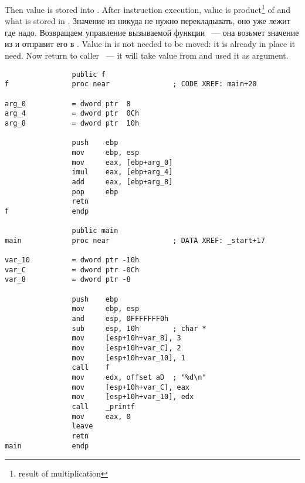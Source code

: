 {Then  value is stored into \EAX. After \IMUL instruction execution, \EAX value is 
product\footnote{result of multiplication} of \EAX and what is stored in .}
\IFRU
{Значение из \EAX никуда не нужно перекладывать, оно уже лежит где надо. Возвращаем управление вызываемой 
функции ~--- она возьмет значение из \EAX и отправит его в \printf.}
{Value in \EAX is not needed to be moved: it is already in place it need. Now return to caller ~--- it 
will take value from \EAX and used it as \printf argument.}

\begin{lstlisting}
                public f
f               proc near               ; CODE XREF: main+20

arg_0           = dword ptr  8
arg_4           = dword ptr  0Ch
arg_8           = dword ptr  10h

                push    ebp
                mov     ebp, esp
                mov     eax, [ebp+arg_0]
                imul    eax, [ebp+arg_4]
                add     eax, [ebp+arg_8]
                pop     ebp
                retn
f               endp

                public main
main            proc near               ; DATA XREF: _start+17

var_10          = dword ptr -10h
var_C           = dword ptr -0Ch
var_8           = dword ptr -8

                push    ebp
                mov     ebp, esp
                and     esp, 0FFFFFFF0h
                sub     esp, 10h        ; char *
                mov     [esp+10h+var_8], 3
                mov     [esp+10h+var_C], 2
                mov     [esp+10h+var_10], 1
                call    f
                mov     edx, offset aD  ; "%d\n"
                mov     [esp+10h+var_C], eax
                mov     [esp+10h+var_10], edx
                call    _printf
                mov     eax, 0
                leave
                retn
main            endp
\end{lstlisting}

